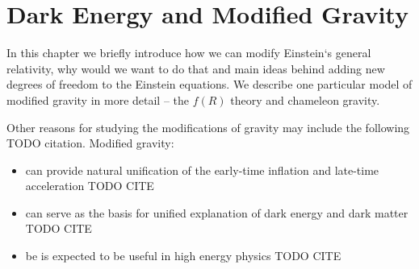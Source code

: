 \chapter{Dark Energy and Modified Gravity}
In this chapter we briefly introduce how we can modify Einstein`s general relativity, why would we want to do that and main ideas behind adding new degrees of freedom to the Einstein equations. We describe one particular model of modified gravity in more detail -- the $f(R)$ theory and chameleon gravity.

Other reasons for studying the modifications of gravity may include the following TODO citation. Modified gravity:
\begin{itemize}
	\item can provide natural unification of the early-time inflation and late-time acceleration TODO CITE
	\item can serve as the basis for unified explanation of dark energy and dark matter TODO CITE
	\item be is expected to be useful in high energy physics TODO CITE
\end{itemize}







